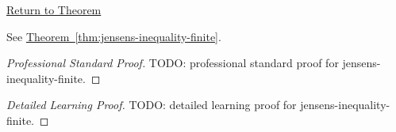 \newpage
{}
\label{prf:jensens-inequality-finite}

\begin{remark*}[Return]
\hyperref[thm:jensens-inequality-finite]{Return to Theorem}
\end{remark*}

\begin{theorem*}
See \hyperref[thm:jensens-inequality-finite]{Theorem~\ref*{thm:jensens-inequality-finite}}.
\end{theorem*}

\begin{proof}[Professional Standard Proof]
\LRAProofBodyStart
TODO: professional standard proof for jensens-inequality-finite.
\end{proof}

\begin{proof}[Detailed Learning Proof]
\LRAProofBodyStart
TODO: detailed learning proof for jensens-inequality-finite.
\end{proof}

\begin{remark*}
\end{remark*}

\begin{dependencies}
\NoLocalDependencies
\end{dependencies}

\clearpage
